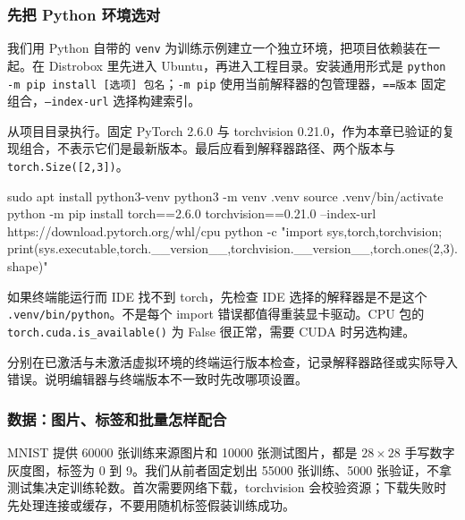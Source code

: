 \subsubsection{先把 Python 环境选对}
我们用 Python 自带的 \texttt{venv} 为训练示例建立一个独立环境，把项目依赖装在一起。在 Distrobox 里先进入 Ubuntu，再进入工程目录。安装通用形式是 \texttt{python -m pip install [选项] 包名}；\texttt{-m pip} 使用当前解释器的包管理器，\texttt{==版本} 固定组合，\texttt{--index-url} 选择构建索引。
\begin{example}
从项目目录执行。固定 PyTorch 2.6.0 与 torchvision 0.21.0，作为本章已验证的复现组合，不表示它们是最新版本。最后应看到解释器路径、两个版本与 \texttt{torch.Size([2,3])}。
\begin{tbash}
sudo apt install python3-venv
python3 -m venv .venv
source .venv/bin/activate
python -m pip install torch==2.6.0 torchvision==0.21.0 --index-url https://download.pytorch.org/whl/cpu
python -c "import sys,torch,torchvision; print(sys.executable,torch.__version__,torchvision.__version__,torch.ones(2,3).shape)"
\end{tbash}
\end{example}
如果终端能运行而 IDE 找不到 torch，先检查 IDE 选择的解释器是不是这个 \texttt{.venv/bin/python}。不是每个 import 错误都值得重装显卡驱动。CPU 包的 \texttt{torch.cuda.is\_available()} 为 False 很正常，需要 CUDA 时另选构建。
\begin{exercise}\label{ex:v2-dl-env}
分别在已激活与未激活虚拟环境的终端运行版本检查，记录解释器路径或实际导入错误。说明编辑器与终端版本不一致时先改哪项设置。
\end{exercise}

\subsubsection{数据：图片、标签和批量怎样配合}
MNIST 提供 60000 张训练来源图片和 10000 张测试图片，都是 $28\times28$ 手写数字灰度图，标签为 0 到 9。我们从前者固定划出 55000 张训练、5000 张验证，不拿测试集决定训练轮数。首次需要网络下载，torchvision 会校验资源；下载失败时先处理连接或缓存，不要用随机标签假装训练成功。

